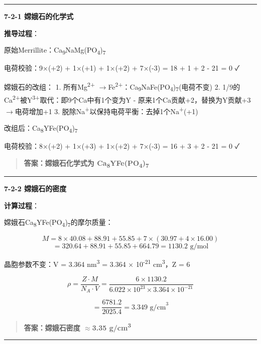 \documentclass[a4paper,11pt]{ctexart}
\newcommand{\箭}{\ensuremath{\rightarrow}}
\newcommand{\左箭}{\ensuremath{\leftarrow}}
\newcommand{\上箭}{\ensuremath{\uparrow}}
\newcommand{\下箭}{\ensuremath{\downarrow}}
\newcommand{\衡}{\ensuremath{\rightleftharpoons}}
\newcommand{\双箭}{\ensuremath{\leftrightarrow}}
\newcommand{\约等于}{\ensuremath{\approx}}
\newcommand{\小于等于}{\ensuremath{\leq}}
\newcommand{\大于等于}{\ensuremath{\geq}}
\newcommand{\不等于}{\ensuremath{\neq}}
\newcommand{\西格马}{\ensuremath{\sigma}}
\newcommand{\派}{\ensuremath{\pi}}
\begin{document}
\begin{center}\rule{0.5\linewidth}{0.5pt}\end{center}

\textbf{7-2-1 嫦娥石的化学式}

\textbf{推导过程}：

原始Merrillite：Ca\textsubscript{9}NaMg(PO\textsubscript{4})\textsubscript{7}

电荷校验：9×(+2) + 1×(+1) + 1×(+2) + 7×(-3) = 18 + 1 + 2 - 21 = 0 ✓

嫦娥石的改组：
1. 所有Mg\textsuperscript{2+} \箭 Fe\textsuperscript{2+}：Ca\textsubscript{9}NaFe(PO\textsubscript{4})\textsubscript{7}(电荷不变)
2. 1/9的Ca\textsuperscript{2+}被Y\textsuperscript{3+}取代：即9个Ca中有1个变为Y
- 原来1个Ca贡献+2，替换为Y贡献+3 \箭 电荷增加+1
3. 脱除Na\textsuperscript{+}以保持电荷平衡：去掉1个Na\textsuperscript{+}(+1)

改组后：Ca\textsubscript{8}YFe(PO\textsubscript{4})\textsubscript{7}

电荷校验：8×(+2) + 1×(+3) + 1×(+2) + 7×(-3) = 16 + 3 + 2 - 21 = 0 ✓

\begin{quote}
\textbf{答案：嫦娥石化学式为 Ca\textsubscript{8}YFe(PO\textsubscript{4})\textsubscript{7}}
\end{quote}

\begin{center}\rule{0.5\linewidth}{0.5pt}\end{center}

\textbf{7-2-2 嫦娥石的密度}

\textbf{计算过程}：

嫦娥石Ca\textsubscript{8}YFe(PO\textsubscript{4})\textsubscript{7}的摩尔质量：

\[M = 8 \times 40.08 + 88.91 + 55.85 + 7 \times (30.97 + 4 \times 16.00)\]
\[= 320.64 + 88.91 + 55.85 + 664.79 = 1130.2 \text{ g/mol}\]

晶胞参数不变：V = 3.364 nm\textsuperscript{3} = 3.364 × 10\textsuperscript{-21} cm\textsuperscript{3}，Z = 6

\[\rho = \frac{Z \cdot M}{N_A \cdot V} = \frac{6 \times 1130.2}{6.022 \times 10^{23} \times 3.364 \times 10^{-21}}\]

\[= \frac{6781.2}{2025.4} = 3.349 \text{ g/cm}^3\]

\begin{quote}
\textbf{答案：嫦娥石密度 \约等于 3.35 g/cm\textsuperscript{3}}
\end{quote}

\begin{center}\rule{0.5\linewidth}{0.5pt}\end{center}
\end{document}

